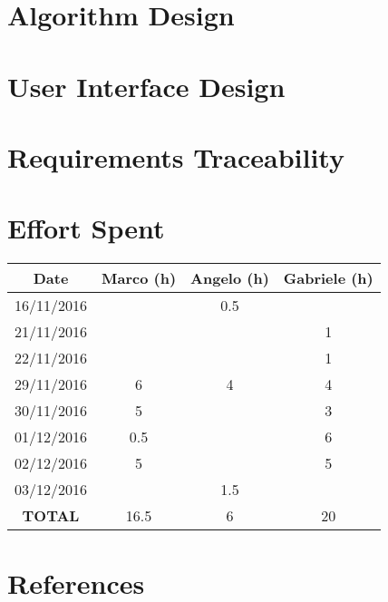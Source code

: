 \documentclass[a4paper,12pt,oneside]{report}
\begin{document}
\chapter{Algorithm Design}

\chapter{User Interface Design}

\chapter{Requirements Traceability}

\chapter{Effort Spent}
\begin{tabular}{|c| c| c| c|}
\hline
\textbf{\large{Date}} 
& \textbf{\large{Marco (h)}} 
& \textbf{\large{Angelo (h)}} 
& \textbf{\large{Gabriele (h)}}\\
\hline
16/11/2016 & & 0.5 & \\
\hline
21/11/2016 & & & 1\\
\hline
22/11/2016 & & & 1\\
\hline
29/11/2016 & 6 & 4 & 4\\
\hline
30/11/2016 & 5 & & 3\\
\hline
01/12/2016 & 0.5 & & 6\\
\hline
02/12/2016 & 5 & & 5\\
\hline
03/12/2016 & & 1.5 & \\
\hline
\textbf{TOTAL} & 16.5 & 6 & 20\\
\hline
\end{tabular}

\chapter{References}


\clearpage


%

\clearpage{} \lhead{}

  


\end{document}

